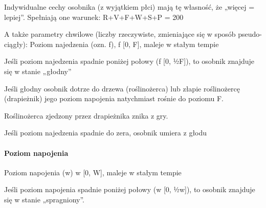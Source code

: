 \begin{DoxyItemize}
\item Indywidualne cechy osobnika (z wyjątkiem płci) mają tę własność, że „więcej = lepiej”. Spełniają one warunek\-: R+\-V+\-F+\-W+\-S+\-P = 200
\end{DoxyItemize}


\begin{DoxyItemize}
\item A także parametry chwilowe (liczby rzeczywiste, zmieniające się w sposób pseudo-\/ciągły)\-: Poziom najedzenia (ozn. f), f  \mbox{[}0, F\mbox{]}, maleje w stałym tempie
\end{DoxyItemize}


\begin{DoxyItemize}
\item Jeśli poziom najedzenia spadnie poniżej połowy (f  \mbox{[}0, ½\-F\mbox{]}), to osobnik znajduje się w stanie „głodny”
\end{DoxyItemize}


\begin{DoxyItemize}
\item Jeśli głodny osobnik dotrze do drzewa (roślinożerca) lub złapie roślinożercę (drapieżnik) jego poziom napojenia natychmiast rośnie do poziomu F.
\end{DoxyItemize}


\begin{DoxyItemize}
\item Roślinożerca zjedzony przez drapieżnika znika z gry.
\end{DoxyItemize}


\begin{DoxyItemize}
\item Jeśli poziom najedzenia spadnie do zera, osobnik umiera z głodu
\end{DoxyItemize}

\paragraph*{Poziom napojenia}


\begin{DoxyItemize}
\item Poziom napojenia (w) w  \mbox{[}0, W\mbox{]}, maleje w stałym tempie
\end{DoxyItemize}


\begin{DoxyItemize}
\item Jeśli poziom napojenia spadnie poniżej połowy (w  \mbox{[}0, ½w\mbox{]}), to osobnik znajduje się w stanie „spragniony”.
\end{DoxyItemize}


